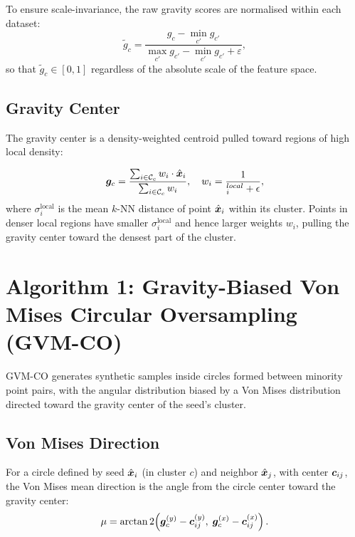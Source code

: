 To ensure scale-invariance, the raw gravity scores are normalised within each dataset:
\begin{equation}
    \tilde{g}_c = \frac{g_c - \min_{c'} g_{c'}}{\max_{c'} g_{c'} - \min_{c'} g_{c'} + \varepsilon},
    \label{eq:gravity_norm}
\end{equation}
so that $\tilde{g}_c \in [0,1]$ regardless of the absolute scale of the feature space.

\subsection{Gravity Center}

The gravity center is a density-weighted centroid pulled toward regions of high local density:

\begin{definition}
\begin{equation}
    \bm{g}_c = \frac{\sum_{i \in \mathcal{C}_c} w_i \cdot \hat{\bm{x}}_i}{\sum_{i \in \mathcal{C}_c} w_i}, \quad w_i = \frac{1}{_i^{local} + \epsilon},
    \label{eq:gravity_centre}
\end{equation}
where $\sigma_i^{\text{local}}$ is the mean $k$-NN distance of point $\hat{\bm{x}}_i$ within its cluster.
Points in denser local regions have smaller $\sigma_i^{\text{local}}$ and hence larger weights $w_i$, pulling the gravity center toward the densest part of the cluster.
\end{definition}


\section{Algorithm 1: Gravity-Biased Von Mises Circular Oversampling (GVM-CO)}
\label{sec:methods:gvm_co}

GVM-CO generates synthetic samples inside circles formed between minority point pairs, with the angular distribution biased by a Von Mises distribution directed toward the gravity center of the seed's cluster.

\subsection{Von Mises Direction}

For a circle defined by seed $\hat{\bm{x}}_i$ (in cluster $c$) and neighbor $\hat{\bm{x}}_j$, with center $\bm{c}_{ij}$, the Von Mises mean direction is the angle from the circle center toward the gravity center:
\begin{equation}
    \mu = \arctan2\!\left(\bm{g}_c^{(y)} - \bm{c}_{ij}^{(y)},\; \bm{g}_c^{(x)} - \bm{c}_{ij}^{(x)}\right).
    \label{eq:mu_direction}
\end{equation}

